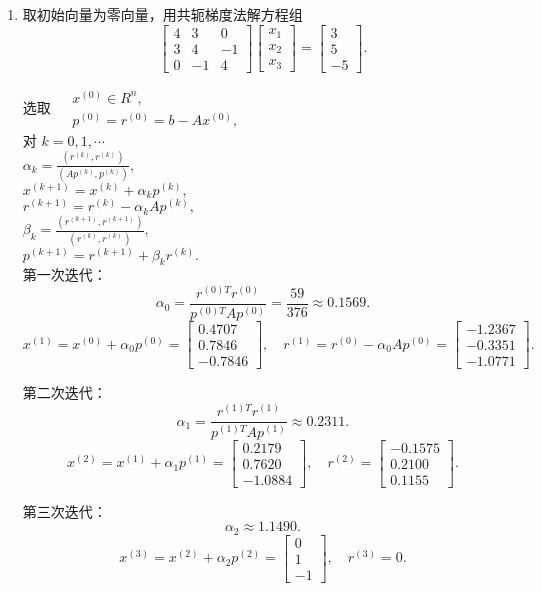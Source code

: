 \documentclass[a4paper]{article}
\begin{document}
\begin{enumerate}
  \item 取初始向量为零向量，用共轭梯度法解方程组
  $$\begin{bmatrix}4 & 3 & 0 \\ 3 & 4 & -1 \\ 0 & -1 & 4\end{bmatrix}\begin{bmatrix}x_{1} \\ x_{2} \\ x_{3}\end{bmatrix}=\begin{bmatrix}3 \\ 5 \\ -5\end{bmatrix}.$$
  \begin{solution}
    选取 $\begin{aligned}&x^{(0)}\in R^n,\\&p^{(0)}=r^{(0)}=b-Ax^{(0)},\end{aligned}$\\
    对 $k= 0, 1, \cdots$\\
   $\alpha_k=\displaystyle\frac{(r^{(k)},r^{(k)})}{(Ap^{(k)},p^{(k)})},$\\
   $x^{(k+1)}=x^{(k)}+\alpha_kp^{(k)},$\\
   $r^{(k+1)}=r^{(k)}-\alpha_kAp^{(k)},$\\
   $\beta_k=\displaystyle\frac{(r^{(k+1)},r^{(k+1)})}{(r^{(k)},r^{(k)})},$\\
   $p^{(k+1)}=r^{(k+1)}+\beta_kr^{(k)}.$\\
   第一次迭代：
\[
\alpha_0=\frac{r^{(0)T}r^{(0)}}{p^{(0)T}Ap^{(0)}}=\frac{59}{376}\approx0.1569.
\]
\[
x^{(1)}=x^{(0)}+\alpha_0 p^{(0)}=
\begin{bmatrix}
0.4707\\
0.7846\\
-0.7846
\end{bmatrix},\quad
r^{(1)}=r^{(0)}-\alpha_0 A p^{(0)}=
\begin{bmatrix}
-1.2367\\
-0.3351\\
-1.0771
\end{bmatrix}.
\]

第二次迭代：
\[
\alpha_1=\frac{r^{(1)T}r^{(1)}}{p^{(1)T}A p^{(1)}}\approx0.2311.
\]
\[
x^{(2)}=x^{(1)}+\alpha_1 p^{(1)}=
\begin{bmatrix}
0.2179\\
0.7620\\
-1.0884
\end{bmatrix},\quad
r^{(2)}=
\begin{bmatrix}
-0.1575\\
0.2100\\
0.1155
\end{bmatrix}.
\]

第三次迭代：
\[
\alpha_2\approx1.1490.
\]
\[
x^{(3)}=x^{(2)}+\alpha_2 p^{(2)}=
\begin{bmatrix}
0\\
1\\
-1
\end{bmatrix},\quad
r^{(3)}=0.
\]
  \end{solution}
\end{enumerate}
\end{document}
